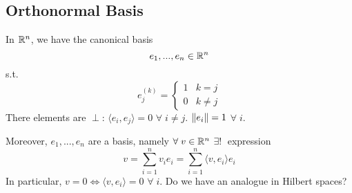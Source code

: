\subsection{Orthonormal Basis}

In \(\mathbb{R}^n\), we have the canonical basis
\[
    e_1, ..., e_n \in \mathbb{R}^n
\]
s.t.
\[
    e_j^{(k)} = 
    \begin{cases}
        1 & k=j \\
        0 & k \neq j   
    \end{cases}
\]
There elements are \(\perp\): \(\langle e_i, e_j\rangle   = 0\) \(\forall\; i \neq j\). \(\norm{e_i}=1\) \(\forall\; i\).

Moreover, \(e_1, ..., e_n\) are a basis, namely \(\forall\; v \in \mathbb{R}^n\) \(\exists! \;\) expression
\[
    v = \sum_{i=1}^n v_i e_i = \sum_{i=1}^n \langle v, e_i\rangle   e_i
\]
In particular, \(v=0 \Leftrightarrow \langle v, e_i\rangle  = 0\) \(\forall\; i\). Do we have an analogue in Hilbert spaces?

